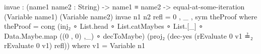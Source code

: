 \documentclass{report}
\begin{document}
\begin{code}
  invae : (name1 name2 : String) ->
          name1 ≡ name2 ->
          equal-at-some-iteration (Variable name1) (Variable name2)
  invae n1 n2 refl = 0 , _ , sym theProof
    where
    theProof =
      cong (inj₂ ∘ List.head ∘ List.catMaybes ∘ List.[_] ∘
            Data.Maybe.map ((0 , 0) ,_) ∘ decToMaybe)
           (proj₂ (dec-yes (rEvaluate 0 v1 ≟₂ rEvaluate 0 v1) refl))
      where v1 = Variable n1
\end{code}
\end{document}
